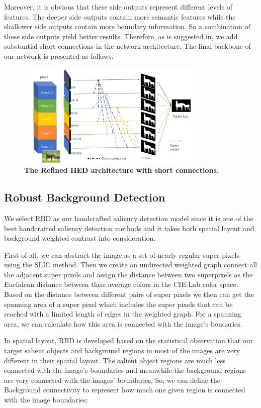 \documentclass[10pt,journal, compsoc]{IEEEtran}
\begin{document}
Moreover, it is obvious that these side outputs represent different levels of features. The deeper side outputs contain more semantic features while the shallower side outputs contain more boundary information. So a combination of these side outputs yield better results. Therefore, as is suggested in\cite{hou2017deeply}, we add substantial short connections in the network architecture. The final backbone of our network is presented as follows.
\begin{figure}[!htbp]
	\centering
	\includegraphics[height=5.0cm,width=9.0cm]{figures/HED_DSS.png}
	\caption{\textbf{The Refined HED architecture with short connections.}}
\end{figure}


\subsection{Robust Background Detection}
We select RBD\cite{zhu2014saliency} as our handcrafted saliency detection model since it is one of the best handcrafted saliency detection methods and it takes both spatial layout and background weighted contrast into consideration.

First of all, we can abstract the image as a set of nearly regular super pixels using the SLIC method. Then we create an undirected weighted graph connect all the adjacent super pixels and assign the distance between two superpixels as the Euclidean distance between their average colors in the CIE-Lab color space. Based on the distance between different pairs of super pixels we then can get the spanning area of a super pixel which includes the super pixels that can be reached with a limited length of edges in the weighted graph. For a spanning area, we can calculate how this area is connected with the image’s boudaries.

In spatial layout, RBD is developed based on the statistical observation that our target salient objects and background regions in most of the images are very different in their spatial layout. The salient object regions are much less connected with the image’s boundaries and meanwhile the background regions are very connected with the images’ boundaries. So, we can define the Background connectivity to represent how much one given region is connected with the image boundaries:
\end{document}
